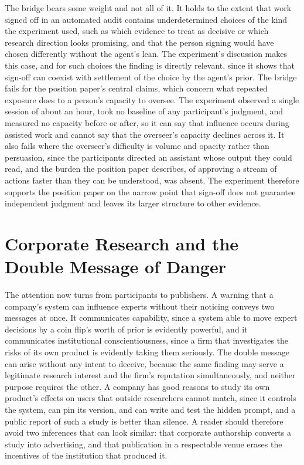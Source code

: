 \documentclass[11pt]{article}
\begin{document}
The bridge bears some weight and not all of it. It holds to the extent that work signed off in an automated audit contains underdetermined choices of the kind the experiment used, such as which evidence to treat as decisive or which research direction looks promising, and that the person signing would have chosen differently without the agent's lean. The experiment's discussion makes this case, and for such choices the finding is directly relevant, since it shows that sign-off can coexist with settlement of the choice by the agent's prior. The bridge fails for the position paper's central claims, which concern what repeated exposure does to a person's capacity to oversee. The experiment observed a single session of about an hour, took no baseline of any participant's judgment, and measured no capacity before or after, so it can say that influence occurs during assisted work and cannot say that the overseer's capacity declines across it. It also fails where the overseer's difficulty is volume and opacity rather than persuasion, since the participants directed an assistant whose output they could read, and the burden the position paper describes, of approving a stream of actions faster than they can be understood, was absent. The experiment therefore supports the position paper on the narrow point that sign-off does not guarantee independent judgment and leaves its larger structure to other evidence.

\section{Corporate Research and the Double Message of Danger}

The attention now turns from participants to publishers. A warning that a company's system can influence experts without their noticing conveys two messages at once. It communicates capability, since a system able to move expert decisions by a coin flip's worth of prior is evidently powerful, and it communicates institutional conscientiousness, since a firm that investigates the risks of its own product is evidently taking them seriously. The double message can arise without any intent to deceive, because the same finding may serve a legitimate research interest and the firm's reputation simultaneously, and neither purpose requires the other. A company has good reasons to study its own product's effects on users that outside researchers cannot match, since it controls the system, can pin its version, and can write and test the hidden prompt, and a public report of such a study is better than silence. A reader should therefore avoid two inferences that can look similar: that corporate authorship converts a study into advertising, and that publication in a respectable venue erases the incentives of the institution that produced it.
\end{document}
